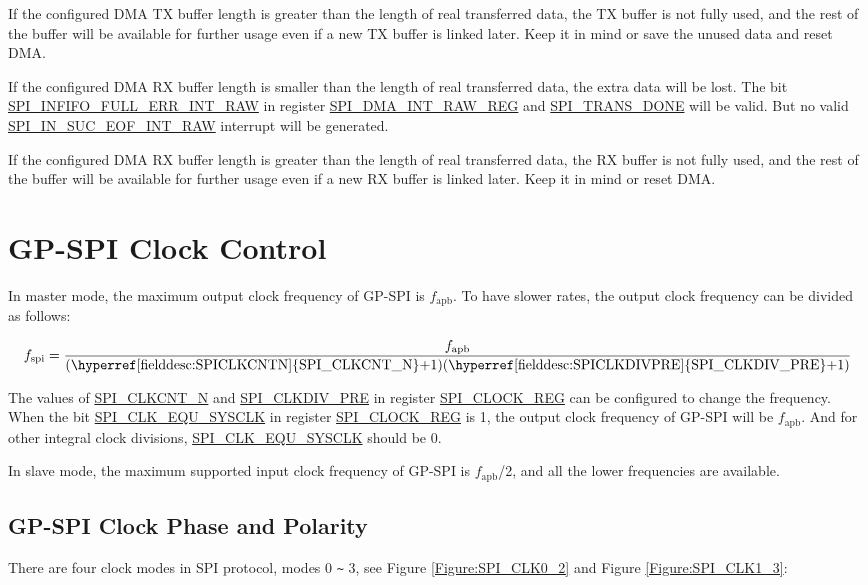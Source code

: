 \documentclass[main\_\_EN.tex]{subfiles}
\begin{document}
If the configured DMA TX buffer length is greater than the length of real transferred data, the TX buffer is not fully used, and the rest of the buffer will be available for further usage even if a new TX buffer is linked later. Keep it in mind or save the unused data and reset DMA.

If the configured DMA RX buffer length is smaller than the length of real transferred data, the extra data will be lost. The bit \hyperref[fielddesc:SPIINFIFOFULLERRINTRAW]{SPI\_INFIFO\_FULL\_ERR\_INT\_RAW} in register \hyperref[regdesc:SPIDMAINTRAWREG]{SPI\_DMA\_INT\_RAW\_REG} and \hyperref[fielddesc:SPITRANSDONE]{SPI\_TRANS\_DONE} will be valid. But no valid \hyperref[fielddesc:SPIINSUCEOFINTRAW]{SPI\_IN\_SUC\_EOF\_INT\_RAW} interrupt will be generated.

If the configured DMA RX buffer length is greater than the length of real transferred data, the RX buffer is not fully used, and the rest of the buffer will be available for further usage even if a new RX buffer is linked later. Keep it in mind or reset DMA.


\section{GP-SPI Clock Control}\label{Subsection:GP-SPI2 CLK}
In master mode, the maximum output clock frequency of GP-SPI is $f_{\textrm{apb}}$. To have slower rates, the output clock frequency can be divided as follows:

    \[
    f_{\textrm{spi}}=\frac{f_{\textrm{apb}}} {\textrm{(\hyperref[fielddesc:SPICLKCNTN]{SPI\_CLKCNT\_N}+1)(\hyperref[fielddesc:SPICLKDIVPRE]{SPI\_CLKDIV\_PRE}+1)}}
    \] \label{division-formula}

The values of \hyperref[fielddesc:SPICLKCNTN]{SPI\_CLKCNT\_N} and \hyperref[fielddesc:SPICLKDIVPRE]{SPI\_CLKDIV\_PRE} in register \hyperref[regdesc:SPICLOCKREG]{SPI\_CLOCK\_REG} can be configured to change the frequency. When the bit \hyperref[fielddesc:SPICLKEQUSYSCLK]{SPI\_CLK\_EQU\_SYSCLK} in register \hyperref[regdesc:SPICLOCKREG]{SPI\_CLOCK\_REG} is 1, the output clock frequency of GP-SPI will be $f_{\textrm{apb}}$. And for other integral clock divisions, \hyperref[fielddesc:SPICLKEQUSYSCLK]{SPI\_CLK\_EQU\_SYSCLK} should be 0.

In slave mode, the maximum supported input clock frequency of GP-SPI is $f_{\textrm{apb}}$/2, and all the lower frequencies are available.

\subsection{GP-SPI Clock Phase and Polarity}
There are four clock modes in SPI protocol, modes 0 \verb+~+ 3, see Figure \ref{Figure:SPI_CLK0_2} and Figure \ref{Figure:SPI_CLK1_3}:
\end{document}
